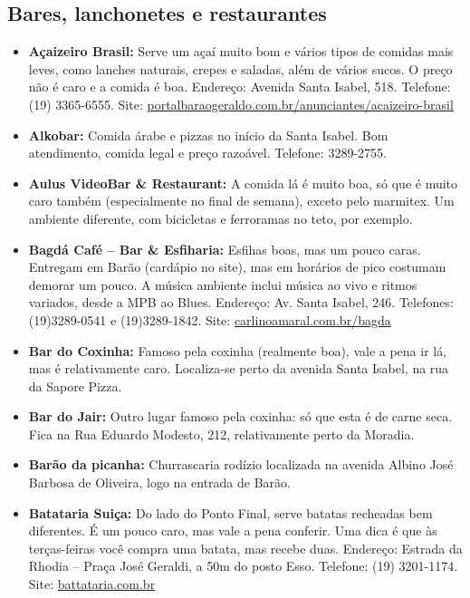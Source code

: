 \subsection{Bares, lanchonetes e restaurantes}
\begin{itemize}
\item  \textbf{Açaizeiro Brasil:} Serve um açaí muito bom e vários tipos de comidas mais leves, como lanches naturais, crepes e saladas, além de vários sucos. O preço não é caro e a comida é boa. Endereço: Avenida Santa Isabel, 518. Telefone: (19) 3365-6555. Site: \url{portalbaraogeraldo.com.br/anunciantes/acaizeiro-brasil}

\item  \textbf{Alkobar:} Comida árabe e pizzas no início da Santa Isabel. Bom atendimento, comida legal e preço razoável. Telefone: 3289-2755.

\item  \textbf{Aulus VideoBar \& Restaurant:} A comida lá é muito boa, só que é muito caro também (especialmente no final de semana), exceto pelo marmitex. Um ambiente diferente, com bicicletas e ferroramas no teto, por exemplo.

\item  \textbf{Bagdá Café -- Bar \& Esfiharia:} Esfihas boas, mas um pouco caras. Entregam em Barão (cardápio no site), mas em horários de pico costumam demorar um pouco. A música ambiente inclui música ao vivo e ritmos variados, desde a MPB ao Blues. Endereço: Av. Santa Isabel, 246. Telefones: (19)3289-0541 e (19)3289-1842. Site: \url{carlinoamaral.com.br/bagda}

\item  \textbf{Bar do Coxinha:} Famoso pela coxinha (realmente boa), vale a pena ir lá, mas é relativamente caro. Localiza-se perto da avenida Santa Isabel, na rua da Sapore Pizza.

\item  \textbf{Bar do Jair:} Outro lugar famoso pela coxinha: só que esta é de carne seca. Fica na Rua Eduardo Modesto, 212, relativamente perto da Moradia.

\item  \textbf{Barão da picanha:} Churrascaria rodízio localizada na avenida Albino José Barbosa de Oliveira, logo na entrada de Barão.

\item  \textbf{Batataria Suiça:} Do lado do Ponto Final, serve batatas recheadas bem diferentes. É um pouco caro, mas vale a pena conferir. Uma dica é que às terças-feiras você compra uma batata, mas recebe duas. Endereço: Estrada da Rhodia -- Praça José Geraldi, a 50m do posto Esso. Telefone: (19) 3201-1174. Site: \url{battataria.com.br}


\end{itemize}

